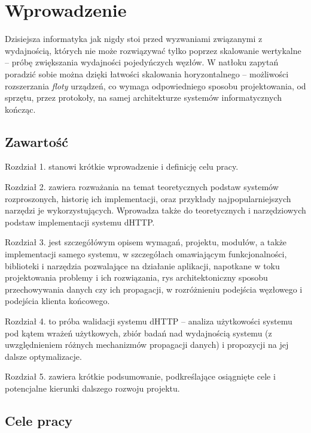 \chapter{Wprowadzenie}
\label{cha:wprowadzenie}

Dzisiejsza informatyka jak nigdy stoi przed wyzwaniami związanymi z wydajnością, 
których nie może rozwiązywać tylko poprzez skalowanie wertykalne -- próbę zwiększania wydajności pojedyńczych węzłów. W natłoku zapytań poradzić sobie można dzięki łatwości skalowania horyzontalnego -- możliwości rozszerzania {\em floty} urządzeń, co wymaga odpowiedniego sposobu projektowania, od sprzętu, przez protokoły, na samej architekturze systemów informatycznych kończąc.

\section{Zawartość}
\label{sec:zawartosc}

Rozdział 1. stanowi krótkie wprowadzenie i definicję celu pracy. 

Rozdział 2. zawiera rozważania na temat teoretycznych podstaw systemów rozproszonych, historię ich implementacji, oraz przykłady najpopularniejszych narzędzi je wykorzystujących. Wprowadza także do teoretycznych i narzędziowych podstaw implementacji systemu dHTTP. 

Rozdział 3. jest szczegółówym opisem wymagań, projektu, modułów, a także implementacji samego systemu, w szczegółach omawiającym funkcjonalności, biblioteki i narzędzia pozwalające na działanie aplikacji, napotkane w toku projektowania problemy i ich rozwiązania, rys architektoniczny sposobu przechowywania danych czy ich propagacji, w rozróżnieniu podejścia węzłowego i podejścia klienta końcowego.

Rozdział 4. to próba walidacji systemu dHTTP – analiza użytkowości systemu pod kątem wrażeń użytkowych, zbiór badań nad wydajnością systemu (z uwzględnieniem różnych mechanizmów propagacji danych) i propozycji na jej dalsze optymalizacje.

Rozdział 5. zawiera krótkie podsumowanie, podkreślające osiągnięte cele i potencjalne kierunki dalszego rozwoju projektu.

\section{Cele pracy}
\label{sec:celePracy}

